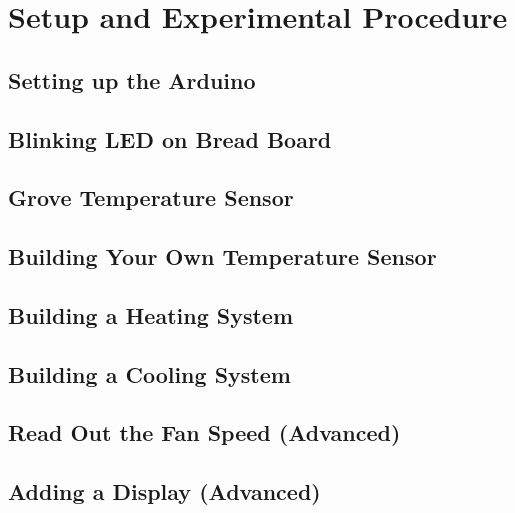 \section{Setup and Experimental Procedure}


\subsection{Setting up the Arduino}

\subsection{Blinking LED on Bread Board}

\subsection{Grove Temperature Sensor}

\subsection{Building Your Own Temperature Sensor}

\subsection{Building a Heating System}

\subsection{Building a Cooling System}

\subsection{Read Out the Fan Speed (Advanced)}

\subsection{Adding a Display (Advanced)}










